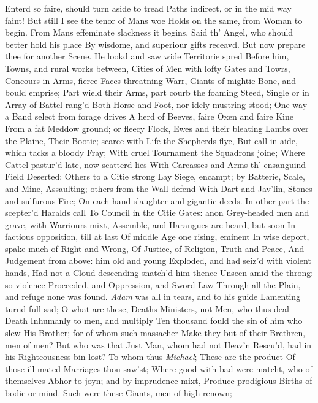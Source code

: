 \documentclass[11pt]{book}
\newcounter {last}
\begin{document}
Enterd so faire, should turn aside to tread 
Paths indirect, or in the mid way faint! 
But still I see the tenor of Mans woe 
Holds on the same, from Woman to begin. 
\quad From Mans effeminate slackness it begins, 
Said th' Angel, who should better hold his place 
By wisdome, and superiour gifts receavd. 
But now prepare thee for another Scene. 
\quad He lookd and saw wide Territorie spred 
Before him, Towns, and rural works between, 
Cities of Men with lofty Gates and Towrs, 
Concours in Arms, fierce Faces threatning Warr, 
Giants of mightie Bone, and bould emprise; 
Part wield their Arms, part courb the foaming Steed, 
Single or in Array of Battel rang'd 
Both Horse and Foot, nor idely mustring stood; 
One way a Band select from forage drives 
A herd of Beeves, faire Oxen and faire Kine 
From a fat Meddow ground; or fleecy Flock, 
Ewes and their bleating Lambs over the Plaine, 
Their Bootie; scarce with Life the Shepherds flye, 
But call in aide, which tacks a bloody Fray; 
With cruel Tournament the Squadrons joine; 
Where Cattel pastur'd late, now scatterd lies 
With Carcasses and Arms th' ensanguind Field 
Deserted: Others to a Citie strong 
Lay Siege, encampt; by Batterie, Scale, and Mine, 
Assaulting; others from the Wall defend 
With Dart and Jav'lin, Stones and sulfurous Fire; 
On each hand slaughter and gigantic deeds. 
In other part the scepter'd Haralds call 
To Council in the Citie Gates: anon 
Grey-headed men and grave, with Warriours mixt, 
Assemble, and Harangues are heard, but soon 
In factious opposition, till at last 
Of middle Age one rising, eminent 
In wise deport, spake much of Right and Wrong, 
Of Justice, of Religion, Truth and Peace, 
And Judgement from above: him old and young 
Exploded, and had seiz'd with violent hands, 
Had not a Cloud descending snatch'd him thence 
Unseen amid the throng: so violence 
Proceeded, and Oppression, and Sword-Law 
Through all the Plain, and refuge none was found. 
\textit{Adam} was all in tears, and to his guide 
Lamenting turnd full sad; O what are these, 
Deaths Ministers, not Men, who thus deal Death 
Inhumanly to men, and multiply 
Ten thousand fould the sin of him who slew 
His Brother; for of whom such massacher 
Make they but of their Brethren, men of men? 
But who was that Just Man, whom had not Heav'n 
Rescu'd, had in his Righteousness bin lost? 
\quad To whom thus \textit{Michael}; These are the product 
Of those ill-mated Marriages thou saw'st; 
Where good with bad were matcht, who of themselves 
Abhor to joyn; and by imprudence mixt, 
Produce prodigious Births of bodie or mind. 
Such were these Giants, men of high renown; 
\end{document}
